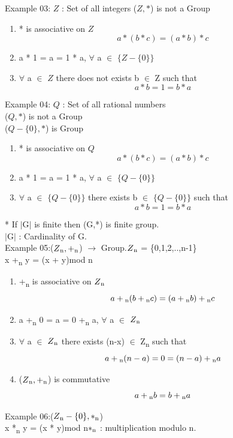 \documentclass[11pt]{article}
\begin{document}
	Example 03: $Z$ : Set of all integers ($Z,*$) is not a Group\\
	\begin{enumerate}
		\item * is associative on $Z$ $$a*(b*c) = (a*b)*c$$
		\item a * 1 = a = 1 * a, $\forall$ a $\in$ $\{Z-\{0\}\}$
		\item $\forall$ a $\in$ $Z$ there does not exists b $\in$ Z such that $$a * b = 1 = b * a $$  
	\end{enumerate}
	Example 04: $Q$ : Set of all rational numbers\\ 
	($Q,*$) is not a Group\\
	($Q-\{0\},*$) is Group\\
	\begin{enumerate}
		\item * is associative on $Q$ $$a*(b*c) = (a*b)*c$$
		\item a * 1 = a = 1 * a, $\forall$ a $\in$ $\{Q-\{0\}\}$
		\item $\forall$ a $\in$ $\{Q-\{0\}\}$ there exists b $\in$ $\{Q-\{0\}\}$ such that $$a * b = 1 = b * a $$  
	\end{enumerate}
	\mbox{*} If $|$G$|$ is finite then (G,*) is finite group.\\
	$|$G$|$ : Cardinality of G.\\
	Example 05:($Z\textsubscript{n},+\textsubscript{n}$)  $\rightarrow$ Group.\hfill $Z\textsubscript{n}$ = \{0,1,2,..,n-1\}  \\
	x +\textsubscript{n} y = (x + y)mod n\\
	\begin{enumerate}
		\item +\textsubscript{n} is associative on $Z\textsubscript{n}$ $$a+\textsubscript{n}(b+\textsubscript{n}c) = (a+\textsubscript{n}b)+\textsubscript{n}c$$
		\item a +\textsubscript{n} 0 = a = 0 +\textsubscript{n} a, $\forall$ a $\in$ $Z\textsubscript{n}$
		\item $\forall$ a $\in$ $Z\textsubscript{n}$ there exists (n-x) $\in$ Z\textsubscript{n} such that $$a +\textsubscript{n} (n-a) = 0 = (n-a) +\textsubscript{n} a $$  
		\item ($Z\textsubscript{n},+\textsubscript{n}$) is commutative $$a +\textsubscript{n} b = b +\textsubscript{n} a$$
	\end{enumerate}
	Example 06:($Z\textsubscript{n}-\{0\},*\textsubscript{n}$) \\
	x *\textsubscript{n} y = (x * y)mod n\hfill $*\textsubscript{n}$ : multiplication modulo n.\\
\end{document}

